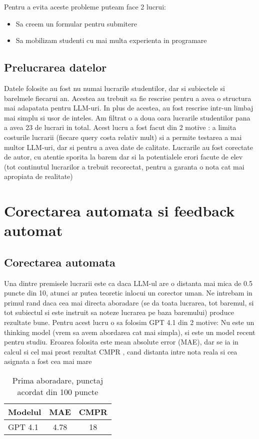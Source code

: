 \documentclass[12pt, a4paper]{report}
\begin{document}
Pentru a evita aceste probleme puteam face 2 lucrui:
\begin{itemize}
  \item Sa creem un formular pentru submitere 
  \item Sa mobilizam studenti cu mai multa experienta in programare
\end{itemize}

\section{Prelucrarea datelor}
Datele folosite au fost nu numai lucrarile studentilor, dar si subiectele si barelmele fiecarui an. Acestea au trebuit sa fie rescrise pentru a avea o structura mai adapatata pentru LLM-uri.
In plus de acestea, au fost rescrise intr-un limbaj mai simplu si usor de inteles. Am filtrat o a doua oara lucrarile studentilor pana a avea 23 de lucrari in total. Acest lucru a fost facut din 2 motive : a limita costurile lucrarii (fiecare query costa relativ mult) si a permite 
testarea a mai multor LLM-uri, dar si pentru a avea date de calitate. 
Lucrarile au fost corectate de autor, cu atentie sporita la barem dar si la potentialele erori facute de elev (tot continutul lucrarilor a trebuit recorectat, pentru a garanta o nota cat mai apropiata de realitate)

\chapter{Corectarea automata si feedback automat}
\section{Corectarea automata}

Una dintre premisele lucrarii este ca daca LLM-ul are o distanta mai mica de 0.5 puncte din 10, atunci ar putea teoretic inlocui un corector uman.
Ne intrebam in primul rand daca cea mai directa aboradare (se da toata lucrarea,
tot baremul, si tot subiectul si este instruit sa noteze lucrarea pe baza baremului) produce rezultate bune.
Pentru acest lucru o sa folosim GPT 4.1 din 2 motive: Nu este un thinking model (vrem sa avem abordarea cat mai simpla), si este un model recent pentru studiu.
Eroarea folosita este mean absolute error (MAE), dar se ia in calcul si cel mai prost rezultat CMPR , cand distanta intre nota reala si cea asignata a fost cea mai mare

\begin{table}[h!]
\centering
\begin{tabular}{|l|c|c|}
\hline
\textbf{Modelul} & \textbf{MAE} & \textbf{CMPR} \\
\hline
GPT 4.1 & 4.78 & 18\\
\hline
\end{tabular}
\caption{Prima aboradare, punctaj acordat din 100 puncte}

\end{table}
\end{document}
